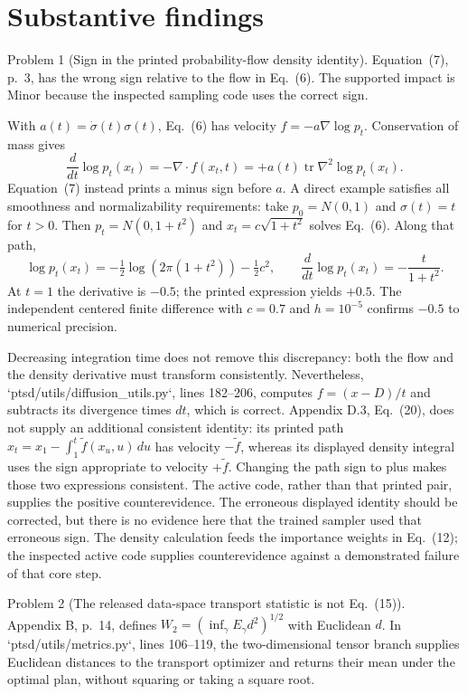 \documentclass[10pt]{article}
\begin{document}
\section*{Substantive findings}
Problem 1 (Sign in the printed probability-flow density identity).  Equation (7), p. 3, has the wrong sign relative to the flow in Eq. (6). The supported impact is Minor because the inspected sampling code uses the correct sign.\par
With \(a(t)=\dot\sigma(t)\sigma(t)\), Eq. (6) has velocity \(f=-a\nabla\log p_t\). Conservation of mass gives \[\frac{d}{dt}\log p_t(x_t)=-\nabla\cdot f(x_t,t)
=+a(t)\operatorname{tr}\nabla^2\log p_t(x_t).\] Equation (7) instead prints a minus sign before \(a\). A direct example satisfies all smoothness and normalizability requirements: take \(p_0=N(0,1)\) and \(\sigma(t)=t\) for \(t>0\). Then \(p_t=N(0,1+t^2)\) and \(x_t=c\sqrt{1+t^2}\) solves Eq. (6). Along that path, \[\log p_t(x_t)=-\tfrac12\log(2\pi(1+t^2))-\tfrac12c^2,
\qquad \frac{d}{dt}\log p_t(x_t)=-\frac{t}{1+t^2}.\] At \(t=1\) the derivative is \(-0.5\); the printed expression yields \(+0.5\). The independent centered finite difference with \(c=0.7\) and \(h=10^{-5}\) confirms \(-0.5\) to numerical precision.\par
Decreasing integration time does not remove this discrepancy: both the flow and the density derivative must transform consistently. Nevertheless, `ptsd/utils/diffusion\_utils.py`, lines 182–206, computes \(f=(x-D)/t\) and subtracts its divergence times \(dt\), which is correct. Appendix D.3, Eq. (20), does not supply an additional consistent identity: its printed path \(x_t=x_1-\int_1^t\widetilde f(x_u,u)\,du\) has velocity \(-\widetilde f\), whereas its displayed density integral uses the sign appropriate to velocity \(+\widetilde f\). Changing the path sign to plus makes those two expressions consistent. The active code, rather than that printed pair, supplies the positive counterevidence. The erroneous displayed identity should be corrected, but there is no evidence here that the trained sampler used that erroneous sign. The density calculation feeds the importance weights in Eq. (12); the inspected active code supplies counterevidence against a demonstrated failure of that core step.\par
Problem 2 (The released data-space transport statistic is not Eq. (15)).  Appendix B, p. 14, defines \(W_2=(\inf_\gamma E_\gamma d^2)^{1/2}\) with Euclidean \(d\). In `ptsd/utils/metrics.py`, lines 106–119, the two-dimensional tensor branch supplies Euclidean distances to the transport optimizer and returns their mean under the optimal plan, without squaring or taking a square root.\par
\end{document}

